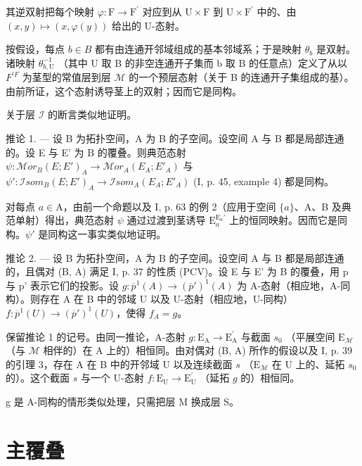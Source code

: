 其逆双射把每个映射 \(\varphi\colon\mathrm{F}\to\mathrm{F}^{\prime}\) 对应到从 \(\mathrm{U}\times\mathrm{F}\) 到 \(\mathrm{U}\times\mathrm{F}^{\prime}\) 中的、由 \((x,y)\mapsto(x,\varphi(y))\) 给出的 U-态射。

按假设，每点 \(b \in B\) 都有由连通开邻域组成的基本邻域系；于是映射 \(\theta_{b}\) 是双射。诸映射 \(\theta_{b,\mathrm{U}}^{-1}\) （其中 U 取 B 的非空连通开子集而 b 取 B 的任意点）定义了从以 \(F^{\prime F}\) 为茎型的常值层到层 \(\mathcal{M}\) 的一个预层态射（关于 B 的连通开子集组成的基）。由前所证，这个态射诱导茎上的双射；因而它是同构。

关于层 \(\mathcal{I}\) 的断言类似地证明。

推论 1. --- 设 B 为拓扑空间，A 为 B 的子空间。设空间 A 与 B 都是局部连通的。设 E 与 E' 为 B 的覆叠。则典范态射 \(\psi\colon\mathcal{M}or_{B}(E;E')_{A}\to\mathcal{M}or_{A}(E_{A};E'_{A})\) 与 \(\psi'\colon\mathcal{I}som_{B}(E;E')_{A}\to\mathcal{I}som_{A}(E_{A};E'_{A})\) (I, p. 45, example 4) 都是同构。

对每点 \(a \in \mathrm{A}\)，由前一个命题以及 I, p. 63 的例 2（应用于空间 \(\{a\}\)、A、B 及典范单射）得出，典范态射 \(\psi\) 通过过渡到茎诱导 \(\mathrm{E}_a^{\mathrm{E}_a'}\) 上的恒同映射。因而它是同构。\(\psi'\) 是同构这一事实类似地证明。

推论 2. --- 设 B 为拓扑空间，A 为 B 的子空间。设空间 A 与 B 都是局部连通的，且偶对 (B, A) 满足 I, p. 37 的性质 (PCV)。设 E 与 E' 为 B 的覆叠，用 p 与 p' 表示它们的投影。设 \(g: \overline{p}^{1}(A) \to (\overline{p}')^{1}(A)\) 为 A-态射（相应地，A-同构）。则存在 A 在 B 中的邻域 U 以及 U-态射（相应地，U-同构）\(f: \overline{p}^{1}(U) \to (\overline{p}')^{1}(U)\)，使得 \(f_{A} = g\)。

保留推论 1 的记号。由同一推论，A-态射 \(g \colon \mathrm{E}_{\mathrm{A}} \to \mathrm{E}_{\mathrm{A}}^{\prime}\) 与截面 \(s_0\) （平展空间 \(\mathrm{E}_{\mathcal{M}}\) （与 \(\mathcal{M}\) 相伴的）在 A 上的）相恒同。由对偶对 (B, A) 所作的假设以及 I, p. 39 的引理 3，存在 A 在 B 中的开邻域 U 以及连续截面 \(s\) （\(\mathrm{E}_{\mathcal{M}}\) 在 U 上的、延拓 \(s_0\) 的）。这个截面 \(s\) 与一个 U-态射 \(f \colon \mathrm{E}_{\mathrm{U}} \to \mathrm{E}_{\mathrm{U}}^{\prime}\) （延拓 \(g\) 的）相恒同。

g 是 A-同构的情形类似处理，只需把层 M 换成层 S。

\section{主覆叠}

